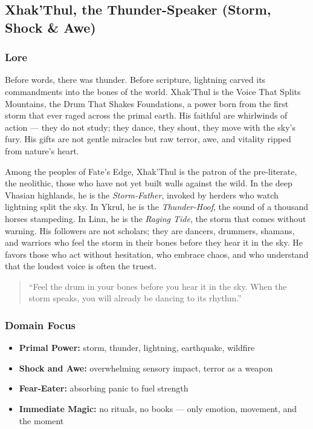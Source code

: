 
\subsection{Xhak'Thul, the Thunder-Speaker (Storm, Shock \& Awe)}

\subsubsection*{Lore}
Before words, there was thunder. Before scripture, lightning carved its commandments into the bones of the world. Xhak'Thul is the Voice That Splits Mountains, the Drum That Shakes Foundations, a power born from the first storm that ever raged across the primal earth. His faithful are whirlwinds of action --- they do not study; they dance, they shout, they move with the sky's fury. His gifts are not gentle miracles but raw terror, awe, and vitality ripped from nature's heart.

Among the peoples of Fate's Edge, Xhak'Thul is the patron of the pre-literate, the neolithic, those who have not yet built walls against the wild. In the deep Vhasian highlands, he is the \textit{Storm-Father}, invoked by herders who watch lightning split the sky. In Ykrul, he is the \textit{Thunder-Hoof}, the sound of a thousand horses stampeding. In Linn, he is the \textit{Raging Tide}, the storm that comes without warning. His followers are not scholars; they are dancers, drummers, shamans, and warriors who feel the storm in their bones before they hear it in the sky. He favors those who act without hesitation, who embrace chaos, and who understand that the loudest voice is often the truest.

\begin{quote}
``Feel the drum in your bones before you hear it in the sky. When the storm speaks, you will already be dancing to its rhythm.''
\end{quote}

\subsubsection*{Domain Focus}
\begin{itemize}
  \item \textbf{Primal Power:} storm, thunder, lightning, earthquake, wildfire
  \item \textbf{Shock and Awe:} overwhelming sensory impact, terror as a weapon
  \item \textbf{Fear-Eater:} absorbing panic to fuel strength
  \item \textbf{Immediate Magic:} no rituals, no books --- only emotion, movement, and the moment
\end{itemize}

